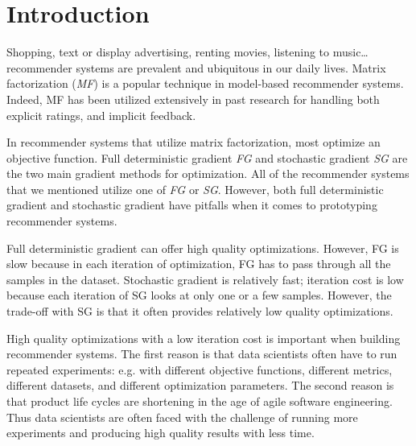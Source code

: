 \section{Introduction}
Shopping, text or display advertising, renting movies, listening to music… recommender systems are prevalent and ubiquitous in our daily lives.  
Matrix factorization (\emph{MF}) is a popular technique in model-based recommender systems.  
Indeed, MF has been utilized extensively in past research for handling both explicit \cite{mmmf2005fast, mnar, gapfm} ratings, 
and implicit \cite{wrmf2008hu, wrmf2008pan, climf, bpr, mnar} feedback.  

In recommender systems that utilize matrix factorization, most optimize an objective function.  
Full deterministic gradient \emph{FG} and stochastic gradient \emph{SG} are the two main gradient methods for optimization.  
All of the recommender systems that we mentioned utilize one of \emph{FG} or \emph{SG}.  
However, both full deterministic gradient and stochastic gradient have pitfalls when it comes to prototyping recommender systems.  

Full deterministic gradient can offer high quality optimizations.  
However, FG is slow because in each iteration of optimization, FG has to pass through all the samples in the dataset.  
Stochastic gradient is relatively fast; iteration cost is low because each iteration of SG looks at only one or a few samples.  
However, the trade-off with SG is that it often provides relatively low quality optimizations.  

High quality optimizations with a low iteration cost is important when building recommender systems.  
The first reason is that data scientists often have to run repeated experiments: e.g. with different objective functions, different metrics, different datasets, and different optimization parameters.  
The second reason is that product life cycles are shortening in the age of agile software engineering.  
Thus data scientists are often faced with the challenge of running more experiments and producing high quality results with less time.  

